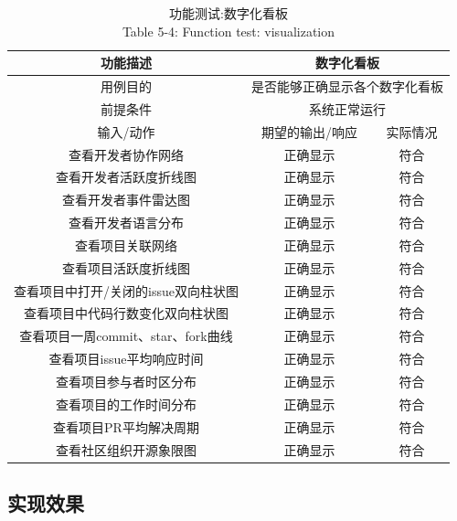 \begin{table}[htbp]\center
    \caption{功能测试:数字化看板\\ Table 5-4:  Function test: visualization}
    \begin{tabular}{|c|c|c|}
        \hline
        功能描述 & \multicolumn{2}{|c|}{数字化看板}\\
        \hline
        用例目的 & \multicolumn{2}{|c|}{是否能够正确显示各个数字化看板}\\
        \hline
        前提条件 & \multicolumn{2}{|c|}{系统正常运行}\\
        \hline
        输入/动作 & 期望的输出/响应 & 实际情况\\
        \hline
        查看开发者协作网络 &正确显示 & 符合 \\
        \hline
        查看开发者活跃度折线图& 正确显示 & 符合 \\
        \hline
        查看开发者事件雷达图 & 正确显示 & 符合 \\
        \hline
        查看开发者语言分布 & 正确显示 & 符合 \\
        \hline
        查看项目关联网络 & 正确显示 & 符合 \\
        \hline
        查看项目活跃度折线图 & 正确显示 & 符合 \\
        \hline
        查看项目中打开/关闭的issue双向柱状图 & 正确显示 & 符合 \\
        \hline
        查看项目中代码行数变化双向柱状图 & 正确显示 & 符合 \\
        \hline
        查看项目一周commit、star、fork曲线 & 正确显示   & 符合 \\
        \hline
        查看项目issue平均响应时间 & 正确显示 & 符合 \\
        \hline
        查看项目参与者时区分布 & 正确显示 & 符合 \\
        \hline
        查看项目的工作时间分布 & 正确显示 & 符合 \\
        \hline
        查看项目PR平均解决周期 & 正确显示 & 符合 \\
        \hline
        查看社区组织开源象限图 & 正确显示& 符合 \\
        \hline
        
    \end{tabular}
\end{table}

\subsection{实现效果}

